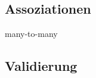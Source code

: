 \subsection{Assoziationen}

\begin{frame}{many-to-many}
  \begin{center}
    
  \end{center}
\end{frame}

\subsection{Validierung}



